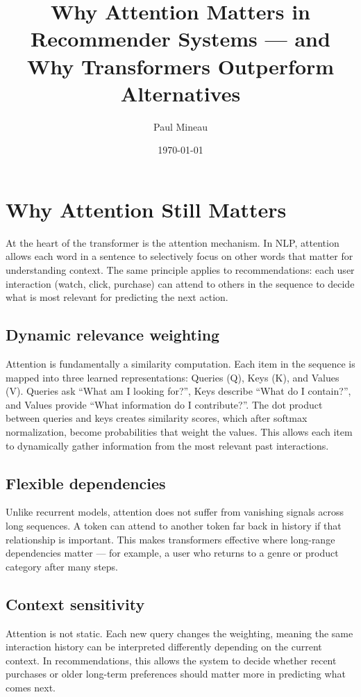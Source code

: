 \documentclass[12pt]{article}
\title{Why Attention Matters in Recommender Systems --- and Why Transformers Outperform Alternatives}
\author{Paul Mineau}
\date{\today}
\begin{document}
\maketitle

\section{Why Attention Still Matters}

At the heart of the transformer is the attention mechanism. In NLP, attention allows each word in a sentence to selectively focus on other words that matter for understanding context. The same principle applies to recommendations: each user interaction (watch, click, purchase) can attend to others in the sequence to decide what is most relevant for predicting the next action.

\subsection{Dynamic relevance weighting}
Attention is fundamentally a similarity computation. Each item in the sequence is mapped into three learned representations: Queries (Q), Keys (K), and Values (V). Queries ask ``What am I looking for?'', Keys describe ``What do I contain?'', and Values provide ``What information do I contribute?''. The dot product between queries and keys creates similarity scores, which after softmax normalization, become probabilities that weight the values. This allows each item to dynamically gather information from the most relevant past interactions.

\subsection{Flexible dependencies}
Unlike recurrent models, attention does not suffer from vanishing signals across long sequences. A token can attend to another token far back in history if that relationship is important. This makes transformers effective where long-range dependencies matter --- for example, a user who returns to a genre or product category after many steps.

\subsection{Context sensitivity}
Attention is not static. Each new query changes the weighting, meaning the same interaction history can be interpreted differently depending on the current context. In recommendations, this allows the system to decide whether recent purchases or older long-term preferences should matter more in predicting what comes next.
\end{document}
